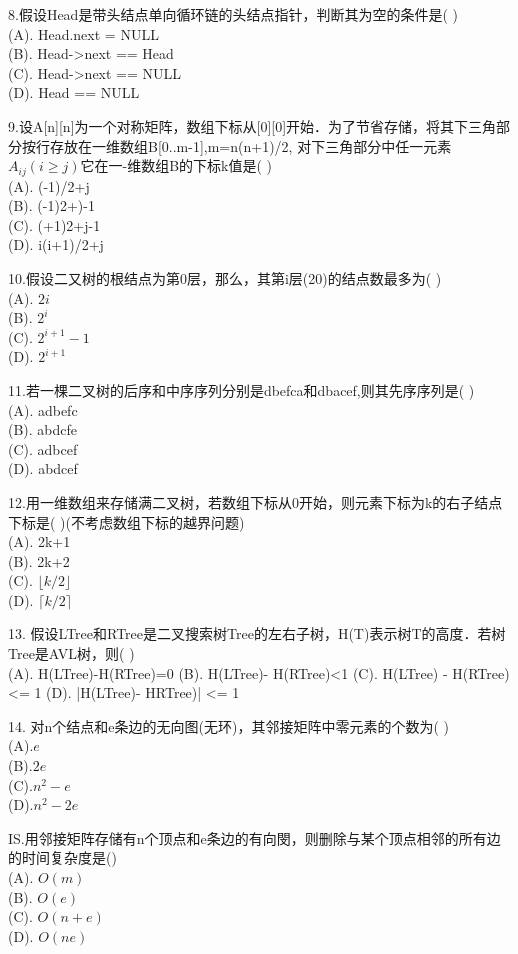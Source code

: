 8.假设Head是带头结点单向循环链的头结点指针，判断其为空的条件是( ) \\
(A). Head.next = NULL \\
(B). Head->next == Head \\
(C). Head->next == NULL \\
(D). Head == NULL

9.设A[n][n]为一个对称矩阵，数组下标从[0][0]开始．为了节省存储，将其下三角部分按行存放在一维数组B[0..m-1],m=n(n+1)/2, 对下三角部分中任一元素$A_{ij}(i\geqslant j)$它在一-维数组B的下标k值是( ) \\
(A). (-1)/2+j \\
(B). (-1)2+)-1 \\
(C). (+1)2+j-1 \\
(D). i(i+1)/2+j

10.假设二又树的根结点为第0层，那么，其第i层(20)的结点数最多为( ) \\
(A). $2i$ \\
(B). $2^i$ \\
(C). $2^{i+1}-1$ \\
(D). $2^{i+1}$

11.若一棵二叉树的后序和中序序列分别是dbefca和dbacef,则其先序序列是( ) \\
(A). adbefc \\
(B). abdcfe \\
(C). adbcef \\
(D). abdcef

12.用一维数组来存储满二叉树，若数组下标从0开始，则元素下标为k的右子结点下标是( )(不考虑数组下标的越界问题) \\
(A). 2k+1 \\
(B). 2k+2 \\
(C). $\lfloor k/2 \rfloor$ \\
(D). $\lceil k/2 \rceil$

13. 假设LTree和RTree是二叉搜索树Tree的左右子树，H(T)表示树T的高度．若树Tree是AVL树，则( ) \\
(A). H(LTree)-H(RTree)=0
(B). H(LTree)- H(RTree)<1
(C). H(LTree) - H(RTree)<= 1
(D). |H(LTree)- HRTree)| <= 1

14. 对n个结点和e条边的无向图(无环)，其邻接矩阵中零元素的个数为( ) \\
(A).$e$ \\
(B).$2e$ \\
(C).$n^2-e$ \\
(D).$n^2-2e$

IS.用邻接矩阵存储有n个顶点和e条边的有向閔，则删除与某个顶点相邻的所有边的时间复杂度是() \\
(A). $O(m)$ \\
(B). $O(e)$ \\
(C). $O(n+e)$ \\
(D). $O(ne)$

